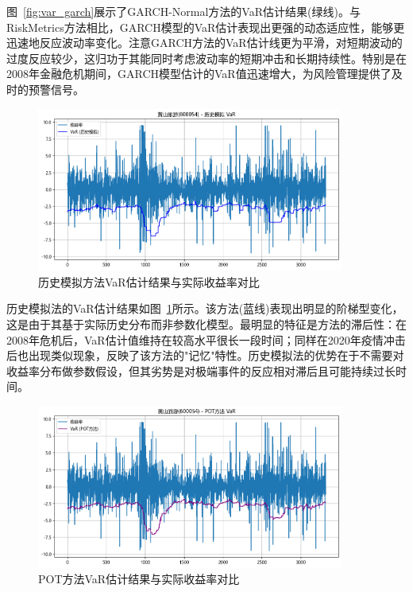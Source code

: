 \documentclass[12pt, a4paper]{article}
\begin{document}
图~\ref{fig:var_garch}展示了GARCH-Normal方法的VaR估计结果(绿线)。与RiskMetrics方法相比，GARCH模型的VaR估计表现出更强的动态适应性，能够更迅速地反应波动率变化。注意GARCH方法的VaR估计线更为平滑，对短期波动的过度反应较少，这归功于其能同时考虑波动率的短期冲击和长期持续性。特别是在2008年金融危机期间，GARCH模型估计的VaR值迅速增大，为风险管理提供了及时的预警信号。

\begin{figure}[htbp]
\centering
\includegraphics[width=0.9\textwidth]{./img/var_hs.png}
\caption{历史模拟方法VaR估计结果与实际收益率对比}
\label{fig:var_hs}
\end{figure}

历史模拟法的VaR估计结果如图~\ref{fig:var_hs}所示。该方法(蓝线)表现出明显的阶梯型变化，这是由于其基于实际历史分布而非参数化模型。最明显的特征是方法的滞后性：在2008年危机后，VaR估计值维持在较高水平很长一段时间；同样在2020年疫情冲击后也出现类似现象，反映了该方法的"记忆"特性。历史模拟法的优势在于不需要对收益率分布做参数假设，但其劣势是对极端事件的反应相对滞后且可能持续过长时间。

\begin{figure}[htbp]
\centering
\includegraphics[width=0.9\textwidth]{./img/var_pot.png}
\caption{POT方法VaR估计结果与实际收益率对比}
\label{fig:var_pot}
\end{figure}
\end{document}
